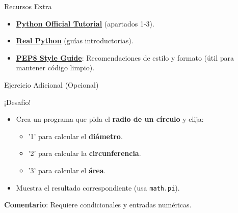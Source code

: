 \documentclass[10pt]{beamer}
\begin{document}
\begin{frame}{Recursos Extra}
  \begin{itemize}
    \item \href{https://docs.python.org/3/tutorial/}{\textbf{Python Official Tutorial}} (apartados 1-3).
    \item \href{https://realpython.com/}{\textbf{Real Python}} (guías introductorias).
    \item \href{https://peps.python.org/pep-0008/}{\textbf{PEP8 Style Guide}}: Recomendaciones de estilo y formato (útil para mantener código limpio).
  \end{itemize}
\end{frame}

\begin{frame}{Ejercicio Adicional (Opcional)}
  \begin{block}{¡Desafío!}
    \begin{itemize}
      \item Crea un programa que pida el \textbf{radio de un círculo} y elija:
        \begin{itemize}
          \item '1' para calcular el \textbf{diámetro}.
          \item '2' para calcular la \textbf{circunferencia}.
          \item '3' para calcular el \textbf{área}.
        \end{itemize}
      \item Muestra el resultado correspondiente (usa \texttt{math.pi}).
    \end{itemize}
  \end{block}
  \textbf{Comentario}: Requiere condicionales y entradas numéricas.
\end{frame}
\end{document}
